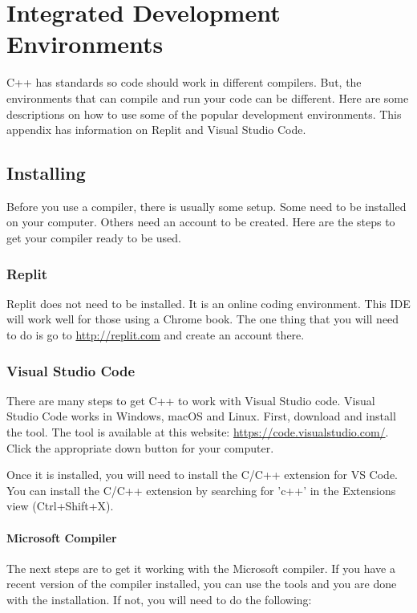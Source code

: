

\chapter{Integrated Development Environments}
C++ has standards so code should work in different compilers. But, the 
environments that can compile and run your code can be different. Here
are some descriptions on how to use some of the popular development
environments. This appendix has information on Replit and Visual Studio Code.
\section{Installing}
\label{installide}
Before you use a compiler, there is usually some setup. Some need to
be installed on your computer. Others need an account to be created.
Here are the steps to get your compiler ready to be used.
\subsection{Replit}
Replit does not need to be installed. It is an online coding environment.
This IDE will work well for those using a Chrome book. The one thing that you will need to do is go to \url{http://replit.com} and create an 
account there.
\subsection{Visual Studio Code}
There are many steps to get C++ to work with Visual Studio code. Visual Studio Code works in Windows, macOS and Linux. First,
download and install the tool. The tool is available at this 
website: \url{https://code.visualstudio.com/}. Click the appropriate
down button for your computer.

Once it is installed, you will need to install the C/C++ extension for VS Code. You can install the C/C++ extension by searching for 'c++' in the Extensions view (Ctrl+Shift+X).

\subsubsection{Microsoft Compiler}
The next steps are to get it working with the Microsoft compiler.
If you have a recent version of the compiler installed, you can use the tools and you are done with the installation. If not, you will need to do the following:

